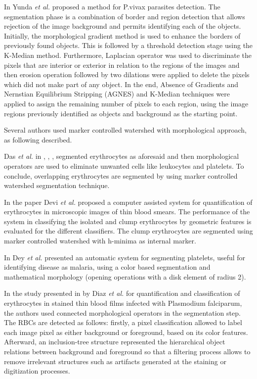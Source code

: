 \documentclass[sensors,review,submit,moreauthors,pdftex,10pt,a4paper]{mdpi}
\begin{document}
In \cite{Yunda2012} Yunda \emph{et al.} proposed a method for P.vivax parasites detection. The segmentation phase is a combination of border and region detection that allows rejection of the image background and permits identifying each of the objects. Initially, the morphological gradient method is used to enhance the borders of previously found objects. This is followed by a threshold detection stage using the K-Median method.
Furthermore, Laplacian operator was used to discriminate the pixels that are interior or exterior in relation to the regions of the images and then erosion operation followed by two dilations were applied to delete the pixels which did not make part of any object. In the end, Absence of Gradients and Nernstian Equilibrium Stripping (AGNES) and K-Median techniques were applied to assign the remaining number of pixels to each region, using the image regions previously identified as objects and background as the starting point.

Several authors used marker controlled watershed with morphological approach, as following described.

Das \emph{et al.} in \cite{Das2011}, \cite{Das2013}, \cite{Das2014}, \cite{Das2015} segmented erythrocytes as aforesaid and then morphological operators are used to eliminate unwanted cells like leukocytes and platelets. To conclude, overlapping erythrocytes are segmented by using marker controlled watershed segmentation technique.

In the paper \cite{Devi2017} Devi \emph{et al.} proposed a computer assisted system for quantification of erythrocytes in microscopic images of thin blood smears. The performance of the system in classifying the isolated and clump erythrocytes by geometric features is evaluated for the different classifiers. The clump erythrocytes are segmented using marker controlled watershed with h-minima as internal marker.

In \cite{Dey2015} Dey \emph{et al.} presented an automatic system for segmenting platelets, useful for identifying disease as malaria, using a color based segmentation and mathematical morphology (opening operations with a disk element of radius 2).

In the study presented in \cite{Diaz2009} by Diaz \emph{et al.} for quantification and classification of erythrocytes in stained thin blood films infected with Plasmodium falciparum, the authors used connected morphological operators in the segmentation step. The RBCs are detected as follows: firstly, a pixel classification allowed to label each image pixel as either background or foreground, based on its color features. Afterward, an inclusion-tree structure represented the hierarchical object relations between background and foreground so that a filtering process allows to remove irrelevant structures such as artifacts generated at the staining or digitization processes.
\end{document}
